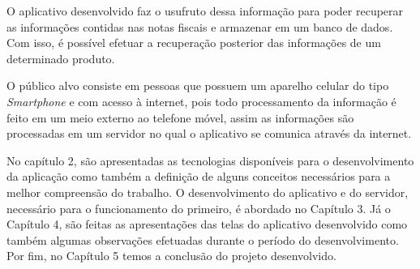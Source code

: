 O aplicativo desenvolvido faz o usufruto dessa informação para poder recuperar as informações contidas nas notas fiscais e armazenar em um banco de dados. Com isso, é possível efetuar a recuperação posterior das informações de um determinado produto.


O público alvo consiste em pessoas que possuem um aparelho celular do tipo \textit{Smartphone} e com acesso à internet, pois todo processamento da informação é feito em um meio externo ao telefone móvel, assim as informações são processadas em um servidor no qual o aplicativo se comunica através da internet.

No capítulo 2, são apresentadas as tecnologias disponíveis para o desenvolvimento da aplicação como também a definição de alguns conceitos necessários para a melhor compreensão do trabalho. O desenvolvimento do aplicativo e do servidor, necessário para o funcionamento do primeiro, é abordado no Capítulo 3. Já o Capítulo 4, são feitas as apresentações das telas do aplicativo desenvolvido como também algumas observações efetuadas durante o período do desenvolvimento. Por fim, no Capítulo 5 temos a conclusão do projeto desenvolvido.
